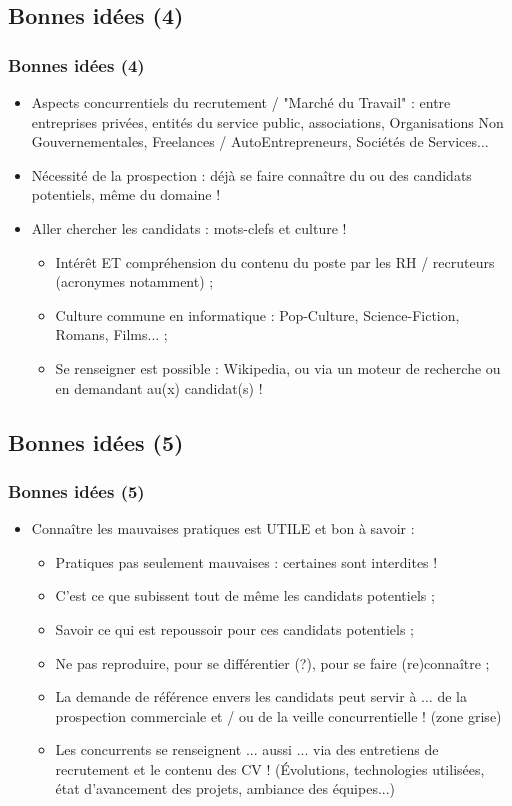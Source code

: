 \documentclass[slidetop,11pt]{beamer}
\begin{document}
\subsection{Bonnes id{\'e}es (4)}
\begin{frame}
	\frametitle{Bonnes id{\'e}es (4)}
	\begin{itemize}
		\item Aspects concurrentiels du recrutement / "March{\'e} du Travail" : entre entreprises priv{\'e}es, entit{\'e}s du service public, associations, Organisations Non Gouvernementales, Freelances / AutoEntrepreneurs, Soci{\'e}t{\'e}s de Services... 
		\item N{\'e}cessit{\'e} de la prospection : d{\'e}j{\`a} se faire conna{\^i}tre du ou des candidats potentiels, m{\^e}me du domaine ! 
		\item Aller chercher les candidats : mots-clefs et culture !
		\begin{itemize}
			\item Int{\'e}r{\^e}t ET compr{\'e}hension du contenu du poste par les RH / recruteurs (acronymes notamment) ;  
			\item Culture commune en informatique : Pop-Culture, Science-Fiction, Romans, Films... ; 
			\item Se renseigner est possible : Wikipedia, ou via un moteur de recherche ou en demandant au(x) candidat(s) !
		\end{itemize}
	\end{itemize} 
\end{frame}

\subsection{Bonnes id{\'e}es (5)}
\begin{frame}
	\frametitle{Bonnes id{\'e}es (5)}
	\begin{itemize}
		\item Conna{\^i}tre les mauvaises pratiques est UTILE et bon {\`a} savoir : 
		\begin{itemize}
			\item Pratiques pas seulement mauvaises : certaines sont interdites ! %
			\item C'est ce que subissent tout de m{\^e}me les candidats potentiels ; 
			\item Savoir ce qui est repoussoir pour ces candidats potentiels ; 
			\item Ne pas reproduire, pour se diff{\'e}rentier (?), pour se faire (re)conna{\^i}tre ; 
			\item La demande de r{\'e}f{\'e}rence envers les candidats peut servir {\`a} ... de la prospection commerciale et / ou de la veille concurrentielle ! (zone grise)
			\item Les concurrents se renseignent ... aussi ... via des entretiens de recrutement et le contenu des CV ! ({\'E}volutions, technologies utilis{\'e}es, {\'e}tat d'avancement des projets, ambiance des {\'e}quipes...)
		\end{itemize}
	\end{itemize} 
\end{frame}
\end{document}
